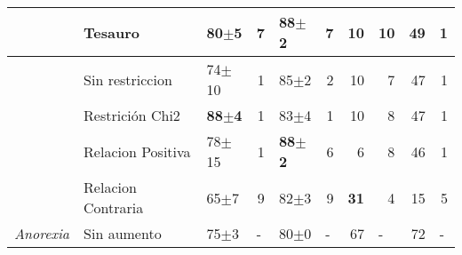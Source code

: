 \begin{table}[h]
\begin{center}
{\begin{tabular}{lllrlrrrrr}
                           & \cellcolor[HTML]{EFEFEF}Tesauro         & \cellcolor[HTML]{EFEFEF}80$\pm$5          & \cellcolor[HTML]{EFEFEF}7                     & \cellcolor[HTML]{EFEFEF}\textbf{88$\pm$2} & \cellcolor[HTML]{EFEFEF}7                     & \cellcolor[HTML]{EFEFEF}10          & \cellcolor[HTML]{EFEFEF}10                    & \cellcolor[HTML]{EFEFEF}49          & \cellcolor[HTML]{EFEFEF}1                     \\ \hline
                           & \cellcolor[HTML]{EFEFEF}Sin restriccion & \cellcolor[HTML]{EFEFEF}74$\pm$10         & \cellcolor[HTML]{EFEFEF}1                     & \cellcolor[HTML]{EFEFEF}85$\pm$2          & \cellcolor[HTML]{EFEFEF}2                     & \cellcolor[HTML]{EFEFEF}10          & \cellcolor[HTML]{EFEFEF}7                     & \cellcolor[HTML]{EFEFEF}47          & \cellcolor[HTML]{EFEFEF}1                     \\ \hline
                           & Restrición Chi2                         & \textbf{88$\pm$4}                         & 1                                             & 83$\pm$4                                  & 1                                             & 10                                  & 8                                             & 47                                  & 1                                             \\ \hline
                           & Relacion Positiva                       & 78$\pm$15                                 & 1                                             & \textbf{88$\pm$2}                         & 6                                             & 6                                   & 8                                             & 46                                  & 1                                             \\ \hline
                           & Relacion Contraria                      & 65$\pm$7                                  & 9                                             & 82$\pm$3                                  & 9                                             & \textbf{31}                         & 4                                             & 15                                  & 5                                             \\ \hline
\textit{Anorexia}          & \cellcolor[HTML]{C0C0C0}Sin aumento     & \cellcolor[HTML]{C0C0C0}75$\pm$3          & \multicolumn{1}{l}{\cellcolor[HTML]{C0C0C0}-} & \cellcolor[HTML]{C0C0C0}80$\pm$0          & \multicolumn{1}{l}{\cellcolor[HTML]{C0C0C0}-} & \cellcolor[HTML]{C0C0C0}67          & \multicolumn{1}{l}{\cellcolor[HTML]{C0C0C0}-} & \cellcolor[HTML]{C0C0C0}72          & \multicolumn{1}{l}{\cellcolor[HTML]{C0C0C0}-} \\ \hline

\end{tabular}}
\end{center}
\end{table}
